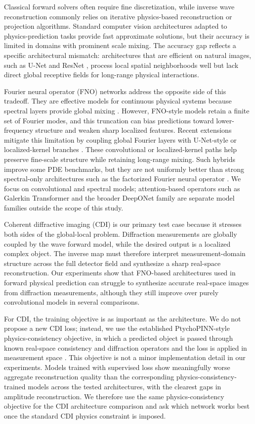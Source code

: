 \documentclass[11pt]{article}
\begin{document}
Classical forward solvers often require fine discretization, while inverse wave
reconstruction commonly relies on iterative physics-based reconstruction or
projection algorithms. Standard computer vision architectures adapted to
physics-prediction tasks provide fast approximate solutions, but their accuracy
is limited in domains with prominent scale mixing. The accuracy gap reflects a
specific architectural mismatch: architectures that are efficient on natural
images, such as U-Net \cite{unet} and ResNet \cite{resnet}, process local
spatial neighborhoods well but lack direct global receptive fields for
long-range physical interactions.

Fourier neural operator (FNO) networks address the opposite side of this
tradeoff. They are effective models for continuous physical systems because
spectral layers provide global mixing \cite{fno}. However, FNO-style models
retain a finite set of Fourier modes, and this truncation can bias predictions
toward lower-frequency structure and weaken sharp localized features. Recent
extensions mitigate this limitation by coupling global Fourier layers with
U-Net-style \cite{unet} or localized-kernel branches \cite{ufno,localno}. These
convolutional or localized-kernel paths help preserve fine-scale structure
while retaining long-range mixing. Such hybrids improve some PDE benchmarks,
but they are not uniformly better than strong spectral-only architectures such
as the factorized Fourier neural operator \cite{ffno}. We focus on convolutional
and spectral models; attention-based operators such as Galerkin Transformer
\cite{galerkin} and the broader DeepONet family \cite{deeponet} are separate
model families outside the scope of this study.

Coherent diffractive imaging (CDI) is our primary test case because it stresses
both sides of the global-local problem. Diffraction measurements are globally coupled by the wave forward
model, while the desired output is a localized complex object. The inverse map
must therefore interpret measurement-domain structure across the full detector
field and synthesize a sharp real-space reconstruction. Our experiments show
that FNO-based architectures used in forward physical prediction can struggle to
synthesize accurate real-space images from diffraction measurements, although
they still improve over purely convolutional models in several comparisons.

For CDI, the training objective is as important as the architecture. We do not
propose a new CDI loss; instead, we use the established PtychoPINN-style
physics-consistency objective, in which a predicted object is passed through
known real-space consistency and diffraction operators and the loss is applied
in measurement space \cite{hoidn2023physics}. This objective is not a minor
implementation detail in our experiments. Models trained with supervised loss
show meaningfully worse aggregate reconstruction quality than the corresponding
physics-consistency-trained models across the tested architectures, with the
clearest gaps in amplitude reconstruction. We therefore use the same
physics-consistency objective for the CDI architecture comparison and ask
which network works best once the standard CDI physics constraint is imposed.
\end{document}
